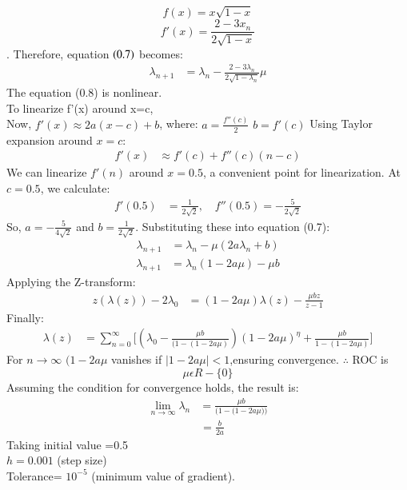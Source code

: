 \documentclass[journal]{IEEEtran}
\begin{document}
$$f(x) = x \sqrt{1 - x}$$
$$f'(x) = \frac{2 - 3x_{n}}{2\sqrt{1 - x}}$$.
Therefore, equation $\left(0.7\right)$ becomes:
\begin{align}
\lambda_{n+1} &= \lambda_n -\frac{2 - 3\lambda_{n}}{2\sqrt{1 - \lambda_n}}{\mu}
\end{align}
The equation (0.8) is nonlinear.\\
To linearize f'(x) around x=c,\\
Now, $f'(x) \approx 2a(x - c) + b$, where:
$a = \frac{f''(c)}{2}$
$b = f'(c)$
Using Taylor expansion around $x = c$:
\begin{align}
f'(x) &\approx f'(c) + f''(c)(n - c)
\end{align}
We can linearize $f'(n)$ around $x = 0.5$, a convenient point for linearization.
At $c = 0.5$, we calculate:
\begin{align}
f'(0.5) &= \frac{1}{2\sqrt{2}}, \quad f''(0.5) = -\frac{5}{2\sqrt{2}}
\end{align}
So, $a = -\frac{5}{4\sqrt{2}}$ and $b = \frac{1}{2\sqrt{2}}$.
Substituting these into equation (0.7):
\begin{align}
\lambda_{n+1} &= \lambda_n - \mu \left( 2a \lambda_n + b \right)
\end{align}
\begin{align}
\lambda_{n+1} &= \lambda_n \left( 1 - 2a\mu \right) - \mu b
\end{align}
Applying the Z-transform:
\begin{align}
z(\lambda(z)) - 2\lambda_0 &= (1 - 2a\mu) \lambda(z) - \frac{\mu{b}z}{z - 1}
\end{align}
Finally:
\begin{align}
\lambda(z) &= \sum_{n=0}^{\infty} \bigg[\left( \lambda_0 - \frac{\mu b}{(1 - (1 - 2a\mu)}\right)  \left( 1 - 2a\mu \right)^{\eta} + \frac{\mu b}{1 - (1 - 2a\mu)}\bigg]
\end{align}
For ${n \to \infty}$ $(1-2a{\mu}$ vanishes if $|1-2a{\mu}|<1$,ensuring convergence.
$\therefore$ ROC is\\
$${\mu} \epsilon R-\{0\}$$
Assuming the condition for convergence holds, the result is:
\begin{align}
\lim_{n \to \infty} \lambda_n &= \frac{{\mu}b}{(1-(1-2a{\mu))}}
\end{align}
\begin{align}
&=\frac{b}{2a}
\end{align}
Taking initial value =0.5\\
$h = 0.001$ (step size)\\
Tolerance= $10^{-5}$ (minimum value of gradient).\\
\end{document}
